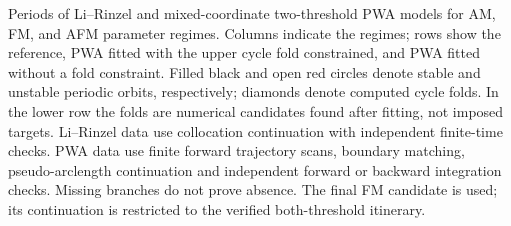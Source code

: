 Periods of Li--Rinzel and mixed-coordinate two-threshold PWA models for AM, FM, and AFM parameter regimes. Columns indicate the regimes; rows show the reference, PWA fitted with the upper cycle fold constrained, and PWA fitted without a fold constraint. Filled black and open red circles denote stable and unstable periodic orbits, respectively; diamonds denote computed cycle folds. In the lower row the folds are numerical candidates found after fitting, not imposed targets. Li--Rinzel data use collocation continuation with independent finite-time checks. PWA data use finite forward trajectory scans, boundary matching, pseudo-arclength continuation and independent forward or backward integration checks. Missing branches do not prove absence. The final FM candidate is used; its continuation is restricted to the verified both-threshold itinerary.

